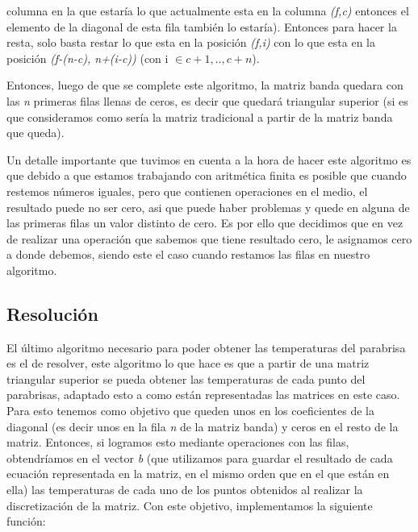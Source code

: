 \documentclass[10pt, a4paper]{article}
\begin{document}
columna en la que estar\'ia lo que actualmente esta en la columna \textit{(f,c)} entonces el elemento de la diagonal de esta fila tambi\'en lo estar\'ia). Entonces para hacer la resta, solo basta restar lo que esta en la  posici\'on \textit{(f,i)} con lo que esta en la posici\'on \textit{(f-(n-c), n+(i-c))} (con i $\in {c+1,..,c+n}$).

Entonces, luego de que se complete este algoritmo, la matriz banda quedara con las \textit{n} primeras filas llenas de ceros, es decir que quedar\'a triangular superior (si es que consideramos como ser\'ia la matriz tradicional a partir de la matriz banda que queda).

Un detalle importante que tuvimos en cuenta a la hora de hacer este algoritmo es que debido a que estamos trabajando con aritm\'etica finita es posible que cuando restemos n\'umeros iguales, pero que contienen operaciones en el medio, el resultado puede no ser cero, asi que puede haber problemas y quede en alguna de las primeras filas un valor distinto de cero. Es por ello que decidimos que en vez de realizar una operaci\'on que sabemos que tiene resultado cero, le asignamos cero a donde debemos, siendo este el caso cuando restamos las filas en nuestro algoritmo.


\subsection{Resoluci\'on}

El \'ultimo algoritmo necesario para poder obtener las temperaturas del parabrisa es el de resolver, este algoritmo lo que hace es que a partir de una matriz triangular superior se pueda obtener las temperaturas de cada punto del parabrisas, adaptado esto a como est\'an representadas las matrices en este caso. Para esto tenemos como objetivo que queden unos en los coeficientes de la diagonal (es decir unos en la fila \textit{n} de la matriz banda) y ceros en el resto de la matriz. Entonces, si logramos esto mediante operaciones con las filas, obtendr\'iamos en el vector \textit{b} (que utilizamos para guardar el resultado de cada ecuaci\'on representada en la matriz, en el mismo orden que en el que est\'an en ella) las temperaturas de cada uno de los puntos obtenidos al realizar la discretizaci\'on de la matriz. Con este objetivo, implementamos la siguiente funci\'on:
\end{document}
